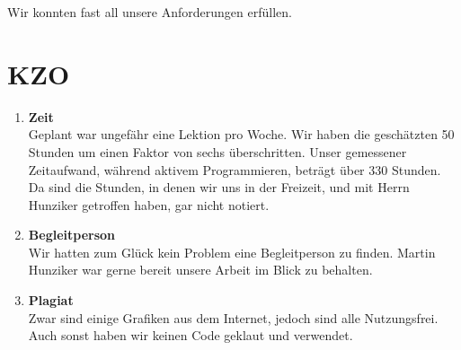 Wir konnten fast all unsere Anforderungen erfüllen.

\section{KZO}
\begin{enumerate}
    \item \textbf{Zeit} \\
        Geplant war ungefähr eine Lektion pro Woche. Wir haben die geschätzten 50 Stunden um einen Faktor von sechs überschritten. Unser gemessener Zeitaufwand, während aktivem Programmieren,
        beträgt über 330 Stunden. Da sind die Stunden, in denen wir uns in der Freizeit, und mit Herrn Hunziker getroffen haben, gar nicht notiert.
    \item \textbf{Begleitperson} \\
        Wir hatten zum Glück kein Problem eine Begleitperson zu finden. Martin Hunziker war gerne bereit unsere Arbeit im Blick zu behalten.
    \item \textbf{Plagiat} \\
        Zwar sind einige Grafiken aus dem Internet, jedoch sind alle Nutzungsfrei. Auch sonst haben wir keinen Code geklaut und verwendet. 
\end{enumerate}

